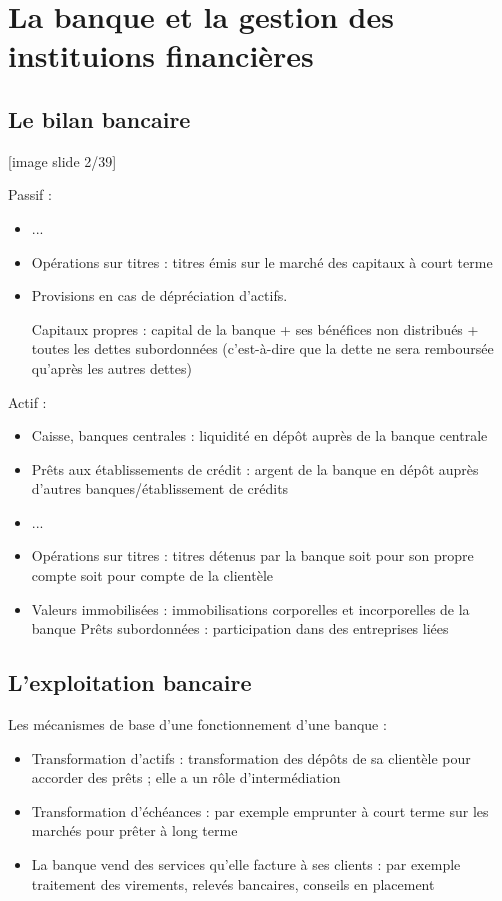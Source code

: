 \chapter{La banque et la gestion des instituions financières}

	\section{Le bilan bancaire}
	
	[image slide 2/39]
	
	Passif :
	
	\begin{itemize}
		\item ...
		\item Opérations sur titres : titres émis sur le marché des capitaux à court terme
		\item Provisions en cas de dépréciation d'actifs. 
		
			Capitaux propres : capital de la banque + ses bénéfices non distribués + toutes les dettes subordonnées (c'est-à-dire que la dette ne sera remboursée qu'après les autres dettes)
	\end{itemize}
	
	Actif :
	
	\begin{itemize}
		\item Caisse, banques centrales : liquidité en dépôt auprès de la banque centrale
		\item Prêts aux établissements de crédit : argent de la banque en dépôt auprès d'autres banques/établissement de crédits
		\item ...
		\item Opérations sur titres : titres détenus par la banque soit pour son propre compte soit pour compte de la clientèle
		\item Valeurs immobilisées : immobilisations corporelles et incorporelles de la banque
		Prêts subordonnées : participation dans des entreprises liées
	\end{itemize}
	
	\section{L'exploitation bancaire}
	
	Les mécanismes de base d'une fonctionnement d'une banque :
	
	\begin{itemize}
		\item Transformation d'actifs : transformation des dépôts de sa clientèle pour accorder des prêts ; elle a un rôle d'intermédiation
		\item Transformation d'échéances : par exemple emprunter à court terme sur les marchés pour prêter à long terme
		\item La banque vend des services qu'elle facture à ses clients : par exemple traitement des virements, relevés bancaires, conseils en placement
	\end{itemize}
	
